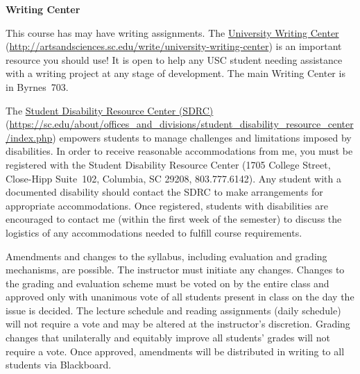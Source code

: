 \documentclass[11pt,letterpaper]{article}
\begin{document}
{\bfseries Writing Center} \par
This course has may have writing assignments. The \href{http://artsandsciences.sc.edu/write/university-writing-center}{University Writing Center} (\url{http://artsandsciences.sc.edu/write/university-writing-center}) is an important resource you should use! It is open to help any USC student needing assistance with a writing project at any stage of development. The main Writing Center is in Byrnes~703. \sectionbreak




The \href{https://sc.edu/about/offices\_and\_divisions/student\_disability\_resource\_center/index.php}{Student Disability Resource Center (SDRC)} (\url{https://sc.edu/about/offices\_and\_divisions/student\_disability\_resource\_center/index.php}) empowers students to manage challenges and limitations imposed by disabilities. In order to receive reasonable accommodations from me, you must be registered with the Student Disability Resource Center (1705 College Street, Close-Hipp Suite~102, Columbia, SC 29208, 803.777.6142). Any student with a documented disability should contact the SDRC to make arrangements for appropriate accommodations. Once registered, students with disabilities are encouraged to contact me (within the first week of the semester) to discuss the logistics of any accommodations needed to fulfill course requirements. \sectionbreak




Amendments and changes to the syllabus, including evaluation and grading mechanisms, are possible. The instructor must initiate any changes. Changes to the grading and evaluation scheme must be voted on by the entire class and approved only with unanimous vote of all students present in class on the day the issue is decided. The lecture schedule and reading assignments (daily schedule) will not require a vote and may be altered at the instructor's discretion. Grading changes that unilaterally and equitably improve all students' grades will not require a vote. Once approved, amendments will be distributed in writing to all students via Blackboard. \pspace



\end{document}
